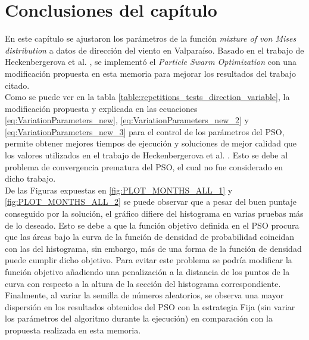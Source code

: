 \section{Conclusiones del capítulo}
En este capítulo se ajustaron los parámetros de la función \emph{mixture of von Mises distribution} a datos de dirección del viento en Valparaíso. Basado en el trabajo de Heckenbergerova et al. \cite{Heckenbergerova15}, se implementó el \emph{Particle Swarm Optimization} con una modificación propuesta en esta memoria para mejorar los resultados del trabajo citado.\\
Como se puede ver en la tabla \ref{table:repetitions_tests_direction_variable}, la modificación propuesta y explicada en las ecuaciones \ref{eq:VariationParameters_new}, \ref{eq:VariationParameters_new_2} y \ref{eq:VariationParameters_new_3} para el control de los parámetros del PSO, permite obtener mejores tiempos de ejecución y soluciones de mejor calidad que los valores utilizados en el trabajo de Heckenbergerova et al. \cite{Heckenbergerova15}. Esto se debe al problema de convergencia prematura del PSO, el cual no fue considerado en dicho trabajo. \\
De las Figuras expuestas en \ref{fig:PLOT_MONTHS_ALL_1} y \ref{fig:PLOT_MONTHS_ALL_2} se puede observar que a pesar del buen puntaje conseguido por la solución, el gráfico difiere del histograma en varias pruebas más de lo deseado. Esto se debe a que la función objetivo definida en el PSO procura que las áreas bajo la curva de la función de densidad de probabilidad coincidan con las del histograma, sin embargo, más de una forma de la función de densidad puede cumplir dicho objetivo. Para evitar este problema se podría modificar la función objetivo añadiendo una penalización a la distancia de los puntos de la curva con respecto a la altura de la sección del histograma correspondiente.\\
Finalmente, al variar la semilla de números aleatorios, se observa una mayor dispersión en los resultados obtenidos del PSO con la estrategia Fija (sin variar los parámetros del algoritmo durante la ejecución) en comparación con la propuesta realizada en esta memoria.